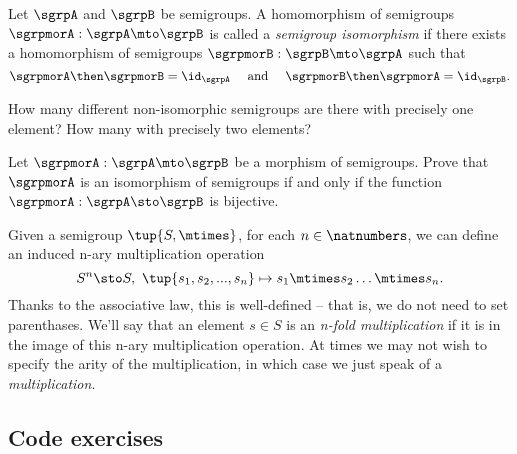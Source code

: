 \begin{definition}
  \label{def:semigroup-iso}
Let $\sgrpA$ and $\sgrpB$ be semigroups. A homomorphism of semigroups $\sgrpmorA: \sgrpA \mto \sgrpB$ is called a \emph{semigroup isomorphism} if there exists a homomorphism of semigroups $\sgrpmorB: \sgrpB \mto \sgrpA$ such that
\begin{equation}\label{sgrp-iso-cond}
\sgrpmorA \then \sgrpmorB = \id_\sgrpA \quad \text{ and } \quad  \sgrpmorB \then \sgrpmorA = \id_\sgrpB.
\end{equation}
\end{definition}

\begin{exercise}\label{ex:non-isomorphic}
How many different non-isomorphic semigroups are there with precisely one element? How many with precisely two elements?
\end{exercise}
\begin{solution}
\end{solution}

\begin{exercise}\label{ex:semi-morph}
Let $\sgrpmorA: \sgrpA \mto \sgrpB$ be a morphism of semigroups. Prove that $\sgrpmorA$ is an isomorphism of semigroups if and only if the function $\sgrpmorA: \sgrpA \sto \sgrpB$ is bijective.
\end{exercise}
\begin{solution}
\end{solution}






Given a semigroup $\tup{S, \mtimes}$, for each $n \in \natnumbers$, we can define an induced n-ary multiplication operation
$$
S^n \sto S, \ \tup{s_1, s_2, ..., s_n} \mapsto s_1 \mtimes s_2 \dots \mtimes s_n.
$$
Thanks to the associative law, this is well-defined -- that is, we do not need to set parenthases. We'll say that an element $s \in S$ is an \emph{n-fold multiplication} if it is in the image of this n-ary multiplication operation. At times we may not wish to specify the arity of the multiplication, in which case we just speak of a \emph{multiplication}. 



\subsection{Code exercises}

